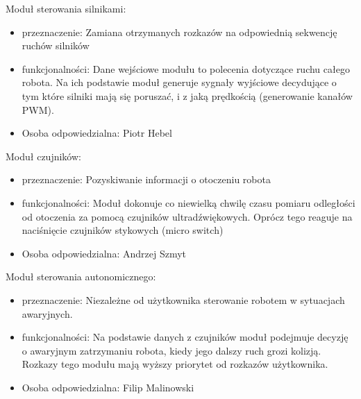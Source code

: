 \documentclass[a4paper]{article}
\begin{document}
Moduł sterowania silnikami:
\begin{itemize}
\item przeznaczenie: Zamiana otrzymanych rozkazów na odpowiednią sekwencję ruchów silników
\item funkcjonalności: Dane wejściowe modułu to polecenia dotyczące ruchu całego robota. Na ich podstawie moduł generuje sygnały wyjściowe decydujące o tym które silniki mają się poruszać, i z jaką prędkością (generowanie kanałów PWM).
\item Osoba odpowiedzialna: Piotr Hebel
\end{itemize}
\newpage
Moduł czujników:
\begin{itemize}
\item przeznaczenie: Pozyskiwanie informacji o otoczeniu robota
\item funkcjonalności: Moduł dokonuje co niewielką chwilę czasu pomiaru odległości od otoczenia za pomocą czujników ultradźwiękowych. Oprócz tego reaguje na naciśnięcie czujników stykowych (micro switch)
\item Osoba odpowiedzialna: Andrzej Szmyt
\end{itemize}

Moduł sterowania autonomicznego:
\begin{itemize}
\item przeznaczenie: Niezależne od użytkownika sterowanie robotem w sytuacjach awaryjnych. 
\item funkcjonalności: Na podstawie danych z czujników moduł podejmuje decyzję o awaryjnym zatrzymaniu robota, kiedy jego dalszy ruch grozi kolizją. Rozkazy tego modułu mają wyższy priorytet od rozkazów użytkownika.
\item Osoba odpowiedzialna: Filip Malinowski
\end{itemize}

\end{document}
